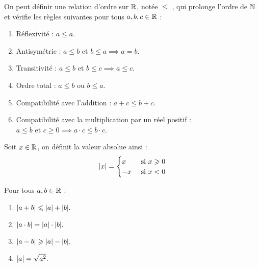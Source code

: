 \begin{proposition}
    On peut définir une relation d'ordre sur $\mathbb{R}$, notée \og $\leq$ \fg, qui prolonge l'ordre de $\mathbb{N}$ et vérifie les règles suivantes pour tous $a, b, c \in \mathbb{R}$ :
    \begin{enumerate}
        \item Réflexivité : $a \leq a$.
        \item Antisymétrie : $a \leq b \text{ et } b \leq a \implies a = b$.
        \item Transitivité : $a \leq b \text{ et } b \leq c \implies a \leq c$.
        \item Ordre total : $a \leq b \text{ ou } b \leq a$.
        \item Compatibilité avec l'addition : $a + c \leq b + c$.
        \item Compatibilité avec la multiplication par un réel positif : $a \leq b \text{ et } c \geq 0 \implies a \cdot c \leq b \cdot c$.
    \end{enumerate}
\end{proposition}

\begin{definition}
    Soit $x \in \mathbb{R}$, on définit la valeur absolue ainsi :
    \begin{align*}
        \abs{x} =
        \begin{cases}
            x &\text{ si } x \geqslant 0 \\
            -x &\text{ si } x < 0
        \end{cases}
    \end{align*}
\end{definition}

\begin{proposition}
   	Pour tous $a, b \in \mathbb{R}$ :
    \begin{enumerate}
            \item $\abs{a + b} \leqslant \abs{a} + \abs{b}.$
            \item $\abs{a \cdot b} = \abs{a} \cdot \abs{b}.$
            \item $\abs{a - b} \geqslant \abs{a} - \abs{b}.$
            \item $\abs{a} = \sqrt{a^2}.$
        \end{enumerate}
\end{proposition}


